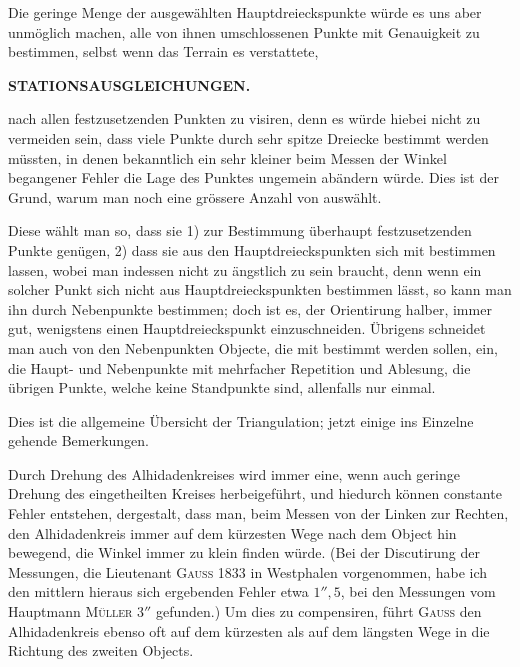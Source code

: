 Die geringe Menge der ausgewählten Hauptdreieckspunkte würde es uns aber unmöglich machen, alle von ihnen umschlossenen Punkte mit Genauigkeit zu bestimmen, selbst wenn das Terrain es verstattete,

\par\clearpage
\noindent\null\hfill{\small\textbf{STATIONSAUSGLEICHUNGEN.}}\hfill{}\par\medskip

\noindent nach allen festzusetzenden Punkten zu visiren, denn es würde hiebei nicht zu vermeiden sein, dass viele Punkte durch sehr spitze Dreiecke bestimmt werden müssten, in denen bekanntlich ein sehr kleiner beim Messen der Winkel begangener Fehler die Lage des Punktes ungemein abändern würde. Dies ist der Grund, warum man noch eine grössere Anzahl von  auswählt.

Diese wählt man so, dass sie 1) zur Bestimmung  überhaupt festzusetzenden Punkte genügen, 2) dass sie  aus den Hauptdreieckspunkten sich mit  bestimmen lassen, wobei man indessen nicht zu ängstlich zu sein braucht, denn wenn ein solcher Punkt sich nicht aus Hauptdreieckspunkten bestimmen lässt, so kann man ihn durch Nebenpunkte bestimmen; doch ist es, der Orientirung halber, immer gut, wenigstens einen Hauptdreieckspunkt einzuschneiden. Übrigens schneidet man auch von den Nebenpunkten  Objecte, die mit bestimmt werden sollen, ein, die Haupt- und Nebenpunkte mit mehrfacher Repetition und Ablesung, die übrigen Punkte, welche keine Standpunkte sind, allenfalls nur einmal.

Dies ist die allgemeine Übersicht der Triangulation; jetzt einige ins Einzelne gehende Bemerkungen.\par
\noindent Durch Drehung des Alhidadenkreises wird immer eine, wenn auch geringe Drehung des eingetheilten Kreises herbeigeführt, und hiedurch können constante Fehler entstehen, dergestalt, dass man, beim Messen von der Linken zur Rechten, den Alhidadenkreis immer auf dem kürzesten Wege nach dem Object hin bewegend, die Winkel immer zu klein finden würde. (Bei der Discutirung der Messungen, die Lieutenant \textsc{Gauss} 1833 in Westphalen vorgenommen, habe ich den mittlern hieraus sich ergebenden Fehler etwa \(1''{,}5\), bei den Messungen vom Hauptmann \textsc{Müller} \(3''\) gefunden.) Um dies zu compensiren, führt \textsc{Gauss} den Alhidadenkreis ebenso oft auf dem kürzesten als auf dem längsten Wege in die Richtung des zweiten Objects.


